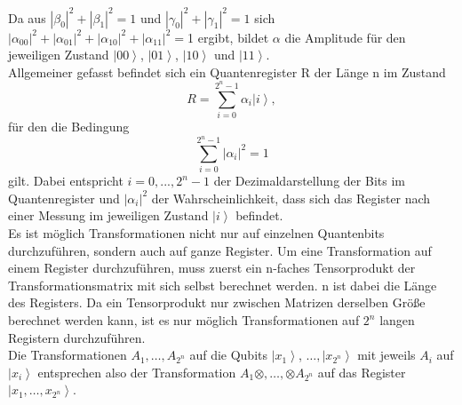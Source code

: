 Da aus $\left|\beta_0\right|^2+\left|\beta_1\right|^2=1$ und $\left|\gamma_0\right|^2+\left|\gamma_1\right|^2=1$ sich $\left|\alpha_{00}\right|^2+\left|\alpha_{01}\right|^2+\left|\alpha_{10}\right|^2+\left|\alpha_{11}\right|^2=$1 ergibt, bildet $\alpha$ die Amplitude für den jeweiligen Zustand $\left|\left.00\right\rangle\right.$, $\left|\left.01\right\rangle\right.$, $\left|\left.10\right\rangle\right.$ und $\left|\left.11\right\rangle\right.$. \\

Allgemeiner gefasst befindet sich ein Quantenregister R der Länge n im Zustand 
\begin{equation}
    R=\sum_{i=0}^{2^n-1}{\alpha_i\left|\left.i\right\rangle\right.},
\end{equation}
für den die Bedingung
\begin{equation}
    \sum_{i=0}^{2^n-1}\left|\alpha_i\right|^2=1
\end{equation}
gilt. Dabei entspricht $i=0,...,2^n-1$ der Dezimaldarstellung der Bits im Quantenregister und $\left|\alpha_i\right|^2$ der Wahrscheinlichkeit, dass sich das Register nach einer Messung im jeweiligen Zustand $\left|\left.i\right\rangle\right.$ befindet.\\

Es ist möglich Transformationen nicht nur auf einzelnen Quantenbits durchzuführen, sondern auch auf ganze Register. Um eine Transformation auf einem Register durchzuführen, muss zuerst ein n-faches Tensorprodukt der Transformationsmatrix mit sich selbst berechnet werden. n ist dabei die Länge des Registers. Da ein Tensorprodukt nur zwischen Matrizen derselben Größe berechnet werden kann, ist es nur möglich Transformationen auf $2^n$ langen Registern durchzuführen. \\

Die Transformationen $A_1,\ldots,A_{2^n}$ auf die Qubits $\left|\left.x_1\right\rangle\right.$, $\ldots,\left|\left.x_{2^n}\right\rangle\right.$ mit jeweils $A_i$ auf $\left|\left.x_i\right\rangle\right.$ entsprechen also der Transformation $A_1\otimes,\ldots,\otimes A_{2^n}$ auf das Register $\left|\left.x_1,\ldots,x_{2^n}\right\rangle\right.$.


